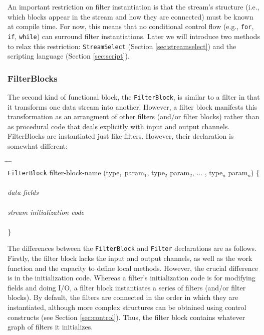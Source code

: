 \documentclass[draft]{article}
\begin{document}
An important restriction on filter instantiation is that the stream's
structure (i.e., which blocks appear in the stream and how they are
connected) must be known at compile time.  For now, this means that no
conditional control flow (e.g., {\tt for}, {\tt if}, {\tt while}) can
surround filter instantiations.  Later we will introduce two methods
to relax this restriction: {\tt StreamSelect} (Section
\ref{sec:streamselect}) and the scripting language (Section
\ref{sec:script}).

\subsubsection{FilterBlocks}

The second kind of functional block, the {\tt FilterBlock}, is similar
to a filter in that it transforms one data stream into another.
However, a filter block manifests this transformation as an arrangment
of other filters (and/or filter blocks) rather than as procedural code
that deals explicitly with input and output channels.  FilterBlocks
are instantiated just like filters.  However, their declaration is
somewhat different:

\begin{tabbing}
\hspace{0.2in} \= \hspace{0.2in} \= \hspace{0.2in} \= \hspace{0.2in} \= \\

{\tt FilterBlock} filter-block-name (type$_1$ param$_1$, type$_2$ param$_2$,
... , type$_n$ param$_n$) \{ \\ \\

\> {\it data fields} \\ \\

\> {\it stream initialization code} \\ \\

\}
\end{tabbing}

The differences between the {\tt FilterBlock} and {\tt Filter}
declarations are as follows.  Firstly, the filter block lacks the
input and output channels, as well as the work function and the
capacity to define local methods.  However, the crucial difference is
in the initialization code.  Whereas a filter's initialization code is
for modifying fields and doing I/O, a filter block instantiates a
series of filters (and/or filter blocks).  By default, the filters are
connected in the order in which they are instantiated, although more
complex structures can be obtained using control constructs (see
Section {\ref{sec:control}}).  Thus, the filter block contains whatever
graph of filters it initializes.  
\end{document}
